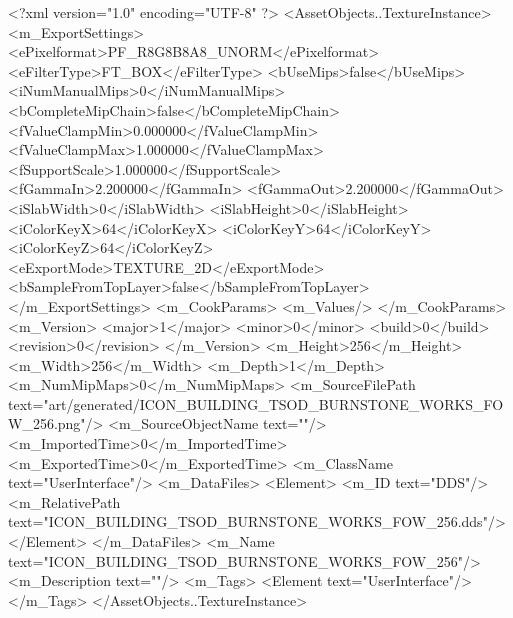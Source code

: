 <?xml version="1.0" encoding="UTF-8" ?>
<AssetObjects..TextureInstance>
	<m_ExportSettings>
		<ePixelformat>PF_R8G8B8A8_UNORM</ePixelformat>
		<eFilterType>FT_BOX</eFilterType>
		<bUseMips>false</bUseMips>
		<iNumManualMips>0</iNumManualMips>
		<bCompleteMipChain>false</bCompleteMipChain>
		<fValueClampMin>0.000000</fValueClampMin>
		<fValueClampMax>1.000000</fValueClampMax>
		<fSupportScale>1.000000</fSupportScale>
		<fGammaIn>2.200000</fGammaIn>
		<fGammaOut>2.200000</fGammaOut>
		<iSlabWidth>0</iSlabWidth>
		<iSlabHeight>0</iSlabHeight>
		<iColorKeyX>64</iColorKeyX>
		<iColorKeyY>64</iColorKeyY>
		<iColorKeyZ>64</iColorKeyZ>
		<eExportMode>TEXTURE_2D</eExportMode>
		<bSampleFromTopLayer>false</bSampleFromTopLayer>
	</m_ExportSettings>
	<m_CookParams>
		<m_Values/>
	</m_CookParams>
	<m_Version>
		<major>1</major>
		<minor>0</minor>
		<build>0</build>
		<revision>0</revision>
	</m_Version>
	<m_Height>256</m_Height>
	<m_Width>256</m_Width>
	<m_Depth>1</m_Depth>
	<m_NumMipMaps>0</m_NumMipMaps>
	<m_SourceFilePath text="art/generated/ICON_BUILDING_TSOD_BURNSTONE_WORKS_FOW_256.png"/>
	<m_SourceObjectName text=""/>
	<m_ImportedTime>0</m_ImportedTime>
	<m_ExportedTime>0</m_ExportedTime>
	<m_ClassName text="UserInterface"/>
	<m_DataFiles>
		<Element>
			<m_ID text="DDS"/>
			<m_RelativePath text="ICON_BUILDING_TSOD_BURNSTONE_WORKS_FOW_256.dds"/>
		</Element>
	</m_DataFiles>
	<m_Name text="ICON_BUILDING_TSOD_BURNSTONE_WORKS_FOW_256"/>
	<m_Description text=""/>
	<m_Tags>
		<Element text="UserInterface"/>
	</m_Tags>
</AssetObjects..TextureInstance>
